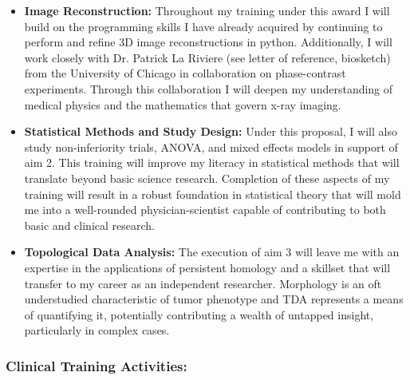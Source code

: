 \documentclass{NIHGrant}
\begin{document}
\begin{itemize}[leftmargin=*, nosep]
  \item \textbf{Image Reconstruction:} Throughout my training under this award I will build on the programming skills I have already acquired by continuing to perform and refine 3D image reconstructions in python. Additionally, I will work closely with Dr. Patrick La Riviere (see letter of reference, biosketch) from the University of Chicago in collaboration on phase-contrast experiments. Through this collaboration I will deepen my understanding of medical physics and the mathematics that govern x-ray imaging.
  \item \textbf{Statistical Methods and Study Design:} Under this proposal, I will also study non-inferiority trials, ANOVA, and mixed effects models in support of aim 2. This training will improve my literacy in statistical methods that will translate beyond basic science research. Completion of these aspects of my training will result in a robust foundation in statistical theory that will mold me into a well-rounded physician-scientist capable of contributing to both basic and clinical research.
  \item \textbf{Topological Data Analysis:} The execution of aim 3 will leave me with an expertise in the applications of persistent homology and a skillset that will transfer to my career as an independent researcher. Morphology is an oft understudied characteristic of tumor phenotype and TDA represents a means of quantifying it, potentially contributing a wealth of untapped insight, particularly in complex cases.
\end{itemize}

\subsubsection*{Clinical Training Activities:}
\end{document}
